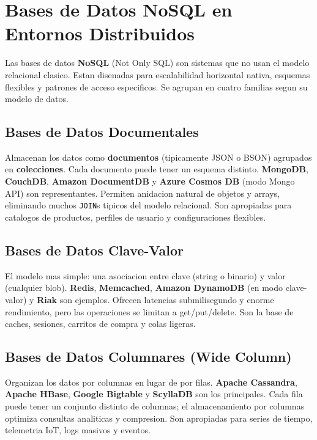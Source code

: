 \documentclass[11pt,a4paper]{article}
\begin{document}
\section{Bases de Datos NoSQL en Entornos Distribuidos}

Las bases de datos \textbf{NoSQL} (Not Only SQL) son sistemas que no usan el modelo relacional clasico. Estan disenadas para escalabilidad horizontal nativa, esquemas flexibles y patrones de acceso especificos. Se agrupan en cuatro familias segun su modelo de datos.

\subsection{Bases de Datos Documentales}

Almacenan los datos como \textbf{documentos} (tipicamente JSON o BSON) agrupados en \textbf{colecciones}. Cada documento puede tener un esquema distinto. \textbf{MongoDB}, \textbf{CouchDB}, \textbf{Amazon DocumentDB} y \textbf{Azure Cosmos DB} (modo Mongo API) son representantes. Permiten anidacion natural de objetos y arrays, eliminando muchos \texttt{JOIN}s tipicos del modelo relacional. Son apropiadas para catalogos de productos, perfiles de usuario y configuraciones flexibles.

\subsection{Bases de Datos Clave-Valor}

El modelo mas simple: una asociacion entre clave (string o binario) y valor (cualquier blob). \textbf{Redis}, \textbf{Memcached}, \textbf{Amazon DynamoDB} (en modo clave-valor) y \textbf{Riak} son ejemplos. Ofrecen latencias submilisegundo y enorme rendimiento, pero las operaciones se limitan a get/put/delete. Son la base de caches, sesiones, carritos de compra y colas ligeras.

\subsection{Bases de Datos Columnares (Wide Column)}

Organizan los datos por columnas en lugar de por filas. \textbf{Apache Cassandra}, \textbf{Apache HBase}, \textbf{Google Bigtable} y \textbf{ScyllaDB} son los principales. Cada fila puede tener un conjunto distinto de columnas; el almacenamiento por columnas optimiza consultas analiticas y compresion. Son apropiadas para series de tiempo, telemetria IoT, logs masivos y eventos.
\end{document}
